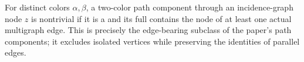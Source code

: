 \begin{definition}
For distinct colors \(\alpha,\beta\), a two-color path component through
an incidence-graph node \(z\) is nontrivial if it is a
 and its full
 contains the node of at least one actual
multigraph edge.  This is precisely the edge-bearing subclass of the
paper's path components; it excludes isolated vertices while preserving
the identities of parallel edges.
\end{definition}
